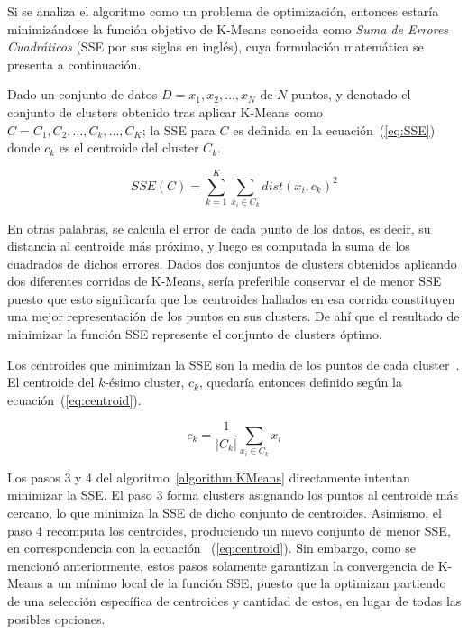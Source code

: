 Si se analiza el algoritmo como un problema de optimización, entonces estaría minimizándose la función objetivo de K-Means conocida como \textit{Suma de Errores Cuadráticos} (SSE por sus siglas en inglés), cuya formulación matemática se presenta a continuación.

Dado un conjunto de datos $D={x_1,x_2,\dots,x_N}$ de $N$ puntos, y denotado el conjunto de clusters obtenido tras aplicar K-Means como $C={C_1,C_2,\dots,C_k,\dots,C_K}$;
la SSE para $C$ es definida en la ecuación~(\ref{eq:SSE}) donde $c_k$ es el centroide del cluster $C_k$.

\begin{equation}
    \label{eq:SSE}
    SSE(C)=\sum_{k=1}^{K}{\sum_{x_{i}\in C_k}{dist(x_i, c_k)^2}}
\end{equation}

En otras palabras, se calcula el error de cada punto de los datos, es decir, su distancia al centroide más próximo, y luego es computada la suma de los cuadrados de dichos errores.
Dados dos conjuntos de clusters obtenidos aplicando dos diferentes corridas de K-Means, sería preferible conservar el de menor SSE puesto que esto significaría que los centroides hallados en esa corrida constituyen una mejor representación de los puntos en sus clusters.
De ahí que el resultado de minimizar la función SSE represente el conjunto de clusters óptimo.

Los centroides que minimizan la SSE son la media de los puntos de cada cluster~\cite{Tan05}.
El centroide del $k$-ésimo cluster, $c_k$, quedaría entonces definido según la ecuación~(\ref{eq:centroid}).

\begin{equation}
    \label{eq:centroid}
    c_{k}=\frac{1}{|C_k|}\sum_{x_{i}\in C_k}{x_i}
\end{equation}

Los pasos 3 y 4 del algoritmo~\ref{algorithm:KMeans} directamente intentan minimizar la SSE. El paso 3 forma clusters asignando los puntos al centroide más cercano, lo que minimiza la SSE de dicho conjunto de centroides.
Asimismo, el paso 4 recomputa los centroides, produciendo un nuevo conjunto de menor SSE, en correspondencia con la ecuación ~(\ref{eq:centroid}).
Sin embargo, como se mencionó anteriormente, estos pasos solamente garantizan la convergencia de K-Means a un mínimo local de la función SSE, puesto que la optimizan partiendo de una selección específica de centroides y cantidad de estos, en lugar de todas las posibles opciones.

